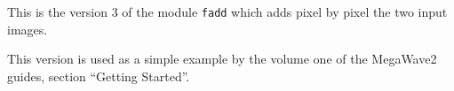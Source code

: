 This is the version 3 of the module \verb+fadd+
which adds pixel by pixel the two input images. 

This version is used as a simple example
by the volume one of the MegaWave2 guides,
section ``Getting Started''.
